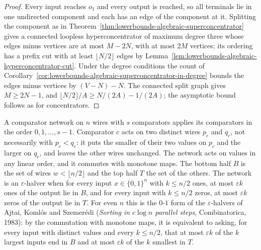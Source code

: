 \begin{proof}
  \leanok
  Every input reaches $o_1$ and every output is reached, so all terminals lie in one undirected
  component and each has an edge of the component at it. Splitting the component as in
  Theorem~\ref{thm:lowerbounds-algebraic-superconcentrator} gives a connected loopless
  hyperconcentrator of maximum degree three whose edges minus vertices are at most $M-2N$, with
  at most $2M$ vertices; its ordering has a prefix cut with at least $\lfloor N/2\rfloor$ edges
  by Lemma~\ref{lem:lowerbounds-algebraic-hyperconcentrator-cut}. Under the degree conditions
  the count of Corollary~\ref{cor:lowerbounds-algebraic-superconcentrator-in-degree} bounds the
  edges minus vertices by $(V-N)-N$. The connected split graph gives $M\ge2N-1$, and
  $\lfloor N/2\rfloor/A\ge N/(2A)-1/(2A)$; the asymptotic bound follows as for concentrators.
\end{proof}

\begin{definition}
  \label{def:lowerbounds-algebraic-halver}
  \leanok
  A comparator network on $n$ wires with $s$ comparators applies its comparators in the order
  $0,1,\dots,s-1$. Comparator $c$ acts on two distinct wires $p_c$ and $q_c$, not necessarily
  with $p_c<q_c$: it puts the smaller of their two values on $p_c$ and the larger on $q_c$, and
  leaves the other wires unchanged. The network acts on values in any linear order, and it
  commutes with monotone maps. The bottom half $B$ is the set of wires $w<\lfloor n/2\rfloor$
  and the top half $T$ the set of the others. The network is an $\varepsilon$-halver when for
  every input $x\in\{0,1\}^n$ with $k\le n/2$ ones, at most $\varepsilon k$ ones of the output
  lie in $B$, and for every input with $k\le n/2$ zeros, at most $\varepsilon k$ zeros of the
  output lie in $T$. For even $n$ this is the $0$-$1$ form of the $\varepsilon$-halvers of Ajtai,
  Koml\'os and Szemer\'edi (\emph{Sorting in $c\log n$ parallel steps}, Combinatorica, 1983): by
  the commutation with monotone maps, it is equivalent to asking, for every input with distinct
  values and every $k\le n/2$, that at most $\varepsilon k$ of the $k$ largest inputs end in $B$
  and at most $\varepsilon k$ of the $k$ smallest in $T$.
\end{definition}

